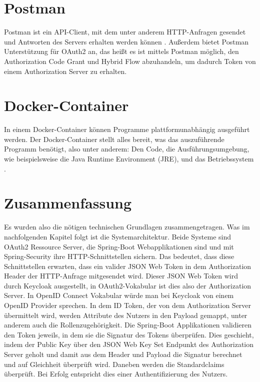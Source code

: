 \section{Postman}
Postman ist ein API-Client, mit dem unter anderem HTTP-Anfragen gesendet und Antworten 
des Servers erhalten werden können \citep{postman:2021}. Außerdem bietet Postman Unterstützung für 
OAuth2 an, das heißt es ist mittels Postman möglich, den Authorization Code Grant und
Hybrid Flow abzuhandeln, um dadurch Token von einem Authorization Server zu erhalten. 

\section{Docker-Container}
In einem Docker-Container können Programme plattformunabhängig ausgeführt werden. 
Der Docker-Container stellt alles bereit, was das auszuführende Programm benötigt, also 
unter anderem: Den Code, die Ausführungsumgebung, wie beispielsweise die Java Runtime 
Environment (JRE), und das Betriebssystem \citep{docker:2021}. 

\section{Zusammenfassung}
Es wurden also die nötigen technischen Grundlagen zusammengetragen. Was im nachfolgenden Kapitel folgt ist die Systemarchitektur.
Beide Systeme sind OAuth2 Ressource Server, die Spring-Boot Webapplikationen sind und mit Spring-Security ihre HTTP-Schnittstellen sichern. Das bedeutet, dass diese Schnittstellen erwarten, dass ein valider JSON Web Token in dem Authorization Header der HTTP-Anfrage mitgesendet wird. Dieser JSON Web Token wird durch Keycloak ausgestellt, in OAuth2-Vokabular ist dies also der Authorization Server. In OpenID Connect Vokabular würde man 
bei Keycloak von einem OpenID Provider sprechen. In dem ID Token, der von dem 
Authorization Server übermittelt wird, werden Attribute des Nutzers in den Payload 
gemappt, unter anderem auch die Rollenzugehörigkeit. Die Spring-Boot Applikationen 
validieren den Token jeweils, in dem sie die Signatur des Tokens überprüfen. Dies 
geschieht, indem der Public Key über den JSON Web Key Set Endpunkt des Authorization 
Server geholt und damit aus dem Header und Payload die Signatur berechnet und auf 
Gleichheit überprüft wird. Daneben werden die Standardclaims überprüft. Bei Erfolg 
entspricht dies einer Authentifizierung des Nutzers.\smallskip

